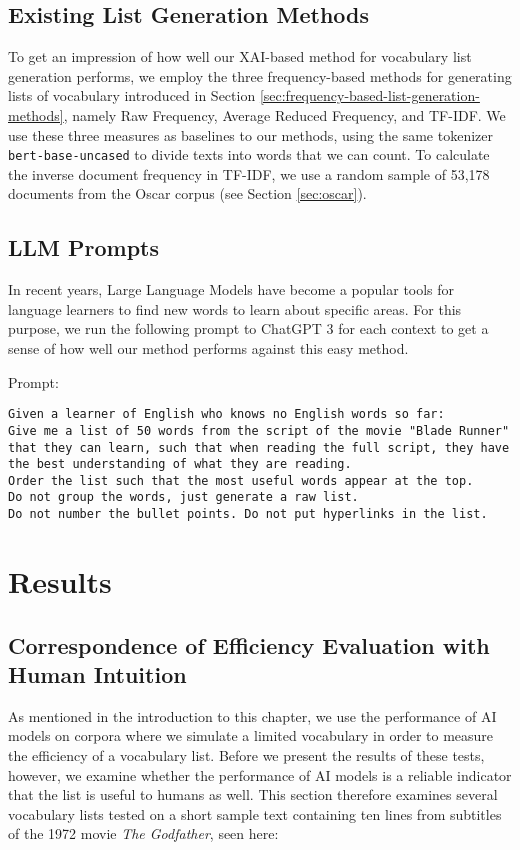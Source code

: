 \subsection{Existing List Generation Methods}
To get an impression of how well our XAI-based method for vocabulary list generation performs, we employ the three frequency-based methods for generating lists of vocabulary introduced in Section \ref{sec:frequency-based-list-generation-methods}, namely Raw Frequency, Average Reduced Frequency, and TF-IDF.
We use these three measures as baselines to our methods, using the same tokenizer \texttt{bert-base-uncased} to divide texts into words that we can count.
To calculate the inverse document frequency in TF-IDF, we use a random sample of 53,178 documents from the Oscar corpus (see Section \ref{sec:oscar}).


\subsection{LLM Prompts}
In recent years, Large Language Models have become a popular tools for language learners to find new words to learn about specific areas.
For this purpose, we run the following prompt to ChatGPT 3 for each context to get a sense of how well our method performs against this easy method.

Prompt:

\begin{lstlisting}[caption={Prompt given to the language model.}, label={lst:blade_runner_prompt}, captionpos=b]
	Given a learner of English who knows no English words so far:
Give me a list of 50 words from the script of the movie "Blade Runner" that they can learn, such that when reading the full script, they have the best understanding of what they are reading.
Order the list such that the most useful words appear at the top.
Do not group the words, just generate a raw list.
Do not number the bullet points. Do not put hyperlinks in the list.

\end{lstlisting}

\section{Results} \label{sec:results}

\subsection{Correspondence of Efficiency Evaluation with Human Intuition}
As mentioned in the introduction to this chapter, we use the performance of AI models on corpora where we simulate a limited vocabulary in order to measure the efficiency of a vocabulary list.
Before we present the results of these tests, however, we examine whether the performance of AI models is a reliable indicator that the list is useful to humans as well.
This section therefore examines several vocabulary lists tested on a short sample text containing ten lines from subtitles of the 1972 movie \textit{The Godfather}, seen here:

